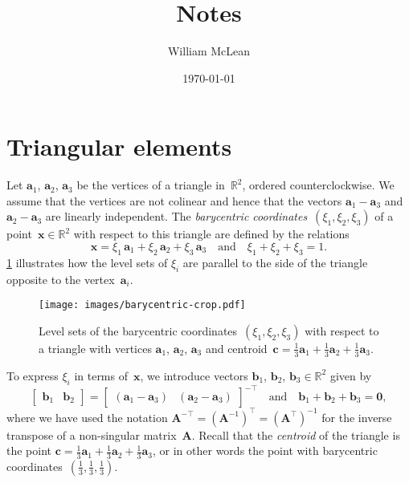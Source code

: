 \documentclass[a4paper,12pt]{article}
\title{Notes}
\author{William McLean}
\date{\today}
\newcommand{\bs}[1]{\boldsymbol{#1}}
\begin{document}
\maketitle
\tableofcontents
\section{Triangular elements}

Let $\bs{a}_1$, $\bs{a}_2$, $\bs{a}_3$ be the vertices of a triangle
in~$\mathbb{R}^2$, ordered counterclockwise.  We assume that the vertices are
not colinear and hence that the vectors $\bs{a}_1-\bs{a}_3$ and
$\bs{a}_2-\bs{a}_3$ are linearly independent.  The
\emph{barycentric coordinates}~$(\xi_1,\xi_2,\xi_3)$ of a
point~$\bs{x}\in\mathbb{R}^2$ with respect to this triangle are defined by the
relations
\[
\bs{x}=\xi_1\,\bs{a}_1+\xi_2\,\bs{a}_2+\xi_3\,\bs{a}_3
\quad\text{and}\quad
\xi_1+\xi_2+\xi_3=1.
\]
\cref{fig: barycentric} illustrates how the level sets of $\xi_i$ are
parallel to the side of the triangle opposite to the vertex~$\bs{a}_i$.

\begin{figure}
\caption{Level sets of the barycentric coordinates~$(\xi_1,\xi_2,\xi_3)$ with
respect to a triangle with vertices $\bs{a}_1$, $\bs{a}_2$, $\bs{a}_3$ and
centroid~$\bs{c}=\tfrac13\bs{a}_1+\tfrac13\bs{a}_2+\tfrac13\bs{a}_3$.}
\label{fig: barycentric}
\begin{center}
\texttt{[image: images/barycentric-crop.pdf]}
\end{center}
\end{figure}

To express $\xi_i$ in terms of~$\bs{x}$, we introduce vectors $\bs{b}_1$,
$\bs{b}_2$, $\bs{b}_3\in\mathbb{R}^2$ given by
\begin{equation}\label{eq: b vectors}
\begin{bmatrix}\bs{b}_1&\bs{b}_2 \end{bmatrix}
    =\begin{bmatrix}(\bs{a}_1-\bs{a}_3)&(\bs{a}_2-\bs{a}_3)\end{bmatrix}^{-\top}
\quad\text{and}\quad
\bs{b}_1+\bs{b}_2+\bs{b}_3=\bs{0},
\end{equation}
where we have used the notation
$\bs{A}^{-\top}=(\bs{A}^{-1})^\top=(\bs{A}^\top)^{-1}$ for the inverse
transpose of a non-singular matrix~$\bs{A}$.  Recall that the \emph{centroid}
of the triangle is the point
$\bs{c}=\tfrac13\bs{a}_1+\tfrac13\bs{a}_2+\tfrac13\bs{a}_3$, or in other words
the point with barycentric coordinates~$(\tfrac13,\tfrac13,\tfrac13)$.
\end{document}
